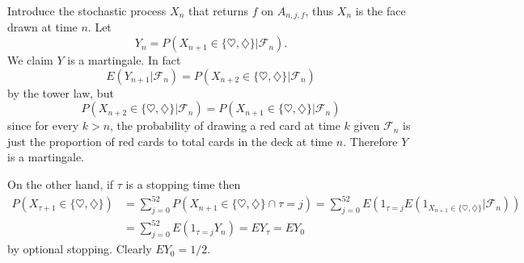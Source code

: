 \documentclass[10pt]{article}
\theoremstyle{definition}
\begin{document}
Introduce the stochastic process $X_n$ that returns $f$ on $A_{n,j,f}$, thus $X_n$ is the face drawn at time $n$.
Let
$$Y_n = P(X_{n+1} \in \{\heartsuit, \diamondsuit\}|\mathcal F_n).$$
We claim $Y$ is a martingale. In fact
$$E(Y_{n+1}|\mathcal F_n) = P(X_{n+2} \in \{\heartsuit, \diamondsuit\}|\mathcal F_n)$$
by the tower law, but
$$P(X_{n+2} \in \{\heartsuit, \diamondsuit\}|\mathcal F_n) = P(X_{n+1} \in \{\heartsuit, \diamondsuit\}|\mathcal F_n)$$
since for every $k > n$, the probability of drawing a red card at time $k$ given $\mathcal F_n$ is just the proportion of red cards to total cards in the deck at time $n$.
Therefore $Y$ is a martingale.

On the other hand, if $\tau$ is a stopping time then
\begin{align*}
P(X_{\tau+1} \in \{\heartsuit, \diamondsuit\}) &= \sum_{j=0}^{52} P(X_{n+1} \in \{\heartsuit, \diamondsuit\} \cap \tau = j)
= \sum_{j=0}^{52} E(1_{\tau = j} E(1_{X_{n+1} \in \{\heartsuit, \diamondsuit\}}|\mathcal F_n))\\
&= \sum_{j=0}^{52} E(1_{\tau = j} Y_n) = EY_\tau = EY_0
\end{align*}
by optional stopping. Clearly $EY_0 = 1/2$.
\end{document}
